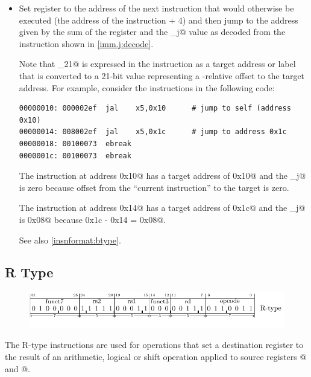 \begin{itemize}
\item{}
\label{insn:jal}

Set register \verb@rd@ to the address of the next instruction that would
otherwise be executed (the address of the \verb@jal@ instruction + 4) and then
jump to the address given by the sum of the \verb@pc@ register and the
\verb@imm_j@ value as decoded from the instruction shown in
\autoref{imm.j:decode}.

Note that \verb@pcrel_21@ is expressed in the instruction as a target address
or label that is converted to a 21-bit value representing a \verb@pc@-relative
offset to the target address.
For example, consider the \verb@jal@ instructions in the following code:

\begin{verbatim}
00000010: 000002ef  jal    x5,0x10      # jump to self (address 0x10)
00000014: 008002ef  jal    x5,0x1c      # jump to address 0x1c
00000018: 00100073  ebreak
0000001c: 00100073  ebreak
\end{verbatim}

The instruction at address \verb@0x10@ has a target address of \verb@0x10@
and the \verb@imm_j@ is zero because offset from the ``current instruction''
to the target is zero.

The instruction at address \verb@0x14@ has a target address of \verb@0x1c@
and the \verb@imm_j@ is \verb@0x08@ because \verb@0x1c - 0x14 = 0x08@.

See also \autoref{insnformat:btype}.

\end{itemize}

\subsection{R Type}
\label{insnformat:rtype}

\begin{figure}[H]
  \includegraphics{figures/chapter05/RType.pdf}
\end{figure}


The R-type instructions are used for operations that set a destination
register \verb@rd@ to the result of an arithmetic, logical or shift operation
applied to source registers @ and @.

